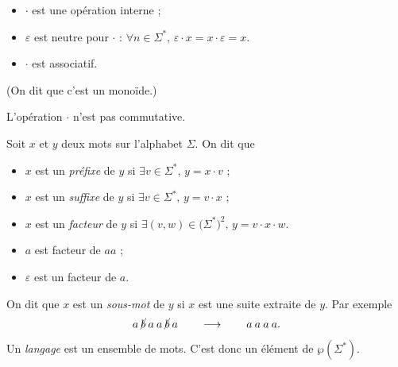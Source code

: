 \begin{rmk}
	\begin{itemize}
		\item $\cdot $\/ est une opération interne ;
		\item $\varepsilon$\/ est neutre pour $\cdot$\/ : \hfill $\forall n \in \Sigma^*,\,\varepsilon \cdot x = x \cdot \varepsilon = x$. \hfill \hbox{}
		\item $\cdot$\/ est associatif.
	\end{itemize}

	(On dit que c'est un monoïde.)
\end{rmk}

\begin{rmk}
	L'opération $\cdot $\/ n'est pas commutative.
\end{rmk}

\begin{defn}
	Soit $x$\/ et $y$\/ deux mots sur l'alphabet $\Sigma$. On dit que 
	\begin{itemize}
		\item $x$\/ est un {\it préfixe}\/ de $y$\/ si \hfill $\exists v \in \Sigma^*,\,y = x \cdot v$\/ ;\hfill\hbox{}
		\item $x$\/ est un {\it suffixe}\/ de $y$\/ si \hfill $\exists v \in \Sigma^*,\,y = v\cdot x$\/ ; \hfill\hbox{}
		\item $x$\/ est un {\it facteur}\/ de $y$\/ si \hfill $\exists (v, w) \in \big(\Sigma^*\big)^2,\,y = v\cdot x\cdot w$. \hfill\hbox{}
	\end{itemize}
\end{defn}

\begin{exm}
	\begin{itemize}
		\item $a$\/ est facteur de $aa$\/ ;
		\item $\varepsilon$\/ est un facteur de $a$.
	\end{itemize}
\end{exm}

\begin{defn}
	On dit que $x$\/ est un {\it sous-mot}\/ de $y$\/ si $x$\/ est une suite extraite de $y$. Par exemple \[
		a\:\cancel{b}\:a\:a\:\cancel{b}\:a \qquad \longrightarrow \qquad a\:a\:a\:a
	.\]
\end{defn}

\begin{defn}
	Un {\it langage}\/ est un ensemble de mots. C'est donc un élément de $\wp(\Sigma^*)$.
\end{defn}

